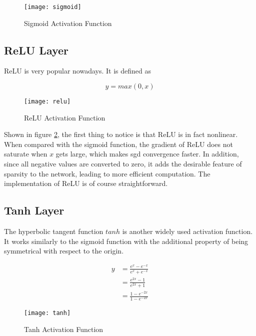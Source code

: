 \begin{figure}[h]
  \centering
  \texttt{[image: sigmoid]}
  \caption{Sigmoid Activation Function}
  \label{fig:sigmoid}
\end{figure}

\subsection{ReLU Layer}

ReLU is very popular nowadays. It is defined as

\begin{equation} \label{eq:relu}
  y = max(0, x)
\end{equation}

\begin{figure}[h]
  \centering
  \texttt{[image: relu]}
  \caption{ReLU Activation Function}
  \label{fig:relu}
\end{figure}

Shown in figure \ref{fig:relu}, the first thing to notice is that ReLU is in fact nonlinear. When compared
with the sigmoid function, the
gradient of ReLU does not saturate when $x$ gets large, which makes \gls{sgd} convergence faster. In addition,
since all negative values are converted to zero, it adds the desirable feature of sparsity to the network,
leading to more efficient computation. The implementation of ReLU is of course straightforward.

\subsection{Tanh Layer}

The hyperbolic tangent function $tanh$ is another widely used activation function. It works similarly to the
sigmoid function with the additional property of being symmetrical with respect to the origin.

\begin{equation} \label{eq:tanh}
  \begin{split}
    y & = \frac{e^x - e^{-x}}{e^{x} + e^{-x}} \\
      & = \frac{e^{2x} - 1}{e^{2x} + 1} \\
      & = \frac{1- e^{-2x}}{1 - e^{-2x}}
  \end{split}
\end{equation}

\begin{figure}[h]
  \centering
  \texttt{[image: tanh]}
  \caption{Tanh Activation Function}
  \label{fig:tanh}
\end{figure}

\clearpage %
